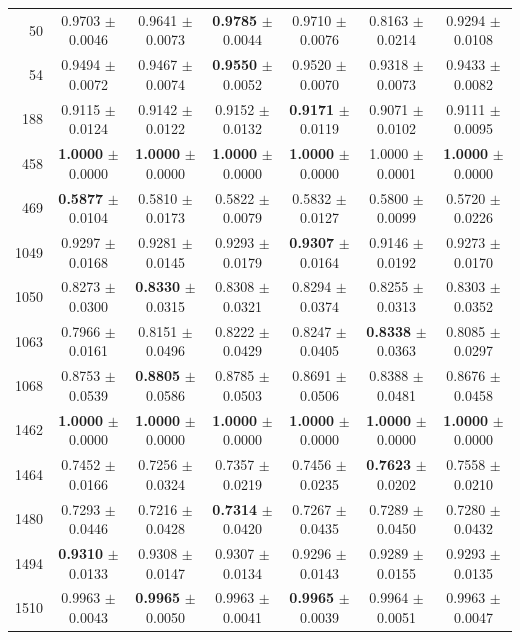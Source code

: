 \begin{table}[t]
\begin{tabular*}{\textwidth}{@{\extracolsep{\fill}}rcccccc@{}}
50 & 0.9703 $\pm$ 0.0046 & 0.9641 $\pm$ 0.0073 & \textbf{0.9785} $\pm$ 0.0044 & 0.9710 $\pm$ 0.0076 & 0.8163 $\pm$ 0.0214 & 0.9294 $\pm$ 0.0108 \\
54 & 0.9494 $\pm$ 0.0072 & 0.9467 $\pm$ 0.0074 & \textbf{0.9550} $\pm$ 0.0052 & 0.9520 $\pm$ 0.0070 & 0.9318 $\pm$ 0.0073 & 0.9433 $\pm$ 0.0082 \\
188 & 0.9115 $\pm$ 0.0124 & 0.9142 $\pm$ 0.0122 & 0.9152 $\pm$ 0.0132 & \textbf{0.9171} $\pm$ 0.0119 & 0.9071 $\pm$ 0.0102 & 0.9111 $\pm$ 0.0095 \\
458 & \textbf{1.0000} $\pm$ 0.0000 & \textbf{1.0000} $\pm$ 0.0000 & \textbf{1.0000} $\pm$ 0.0000 & \textbf{1.0000} $\pm$ 0.0000 & 1.0000 $\pm$ 0.0001 & \textbf{1.0000} $\pm$ 0.0000 \\
469 & \textbf{0.5877} $\pm$ 0.0104 & 0.5810 $\pm$ 0.0173 & 0.5822 $\pm$ 0.0079 & 0.5832 $\pm$ 0.0127 & 0.5800 $\pm$ 0.0099 & 0.5720 $\pm$ 0.0226 \\
1049 & 0.9297 $\pm$ 0.0168 & 0.9281 $\pm$ 0.0145 & 0.9293 $\pm$ 0.0179 & \textbf{0.9307} $\pm$ 0.0164 & 0.9146 $\pm$ 0.0192 & 0.9273 $\pm$ 0.0170 \\
1050 & 0.8273 $\pm$ 0.0300 & \textbf{0.8330} $\pm$ 0.0315 & 0.8308 $\pm$ 0.0321 & 0.8294 $\pm$ 0.0374 & 0.8255 $\pm$ 0.0313 & 0.8303 $\pm$ 0.0352 \\
1063 & 0.7966 $\pm$ 0.0161 & 0.8151 $\pm$ 0.0496 & 0.8222 $\pm$ 0.0429 & 0.8247 $\pm$ 0.0405 & \textbf{0.8338} $\pm$ 0.0363 & 0.8085 $\pm$ 0.0297 \\
1068 & 0.8753 $\pm$ 0.0539 & \textbf{0.8805} $\pm$ 0.0586 & 0.8785 $\pm$ 0.0503 & 0.8691 $\pm$ 0.0506 & 0.8388 $\pm$ 0.0481 & 0.8676 $\pm$ 0.0458 \\
1462 & \textbf{1.0000} $\pm$ 0.0000 & \textbf{1.0000} $\pm$ 0.0000 & \textbf{1.0000} $\pm$ 0.0000 & \textbf{1.0000} $\pm$ 0.0000 & \textbf{1.0000} $\pm$ 0.0000 & \textbf{1.0000} $\pm$ 0.0000 \\
1464 & 0.7452 $\pm$ 0.0166 & 0.7256 $\pm$ 0.0324 & 0.7357 $\pm$ 0.0219 & 0.7456 $\pm$ 0.0235 & \textbf{0.7623} $\pm$ 0.0202 & 0.7558 $\pm$ 0.0210 \\
1480 & 0.7293 $\pm$ 0.0446 & 0.7216 $\pm$ 0.0428 & \textbf{0.7314} $\pm$ 0.0420 & 0.7267 $\pm$ 0.0435 & 0.7289 $\pm$ 0.0450 & 0.7280 $\pm$ 0.0432 \\
1494 & \textbf{0.9310} $\pm$ 0.0133 & 0.9308 $\pm$ 0.0147 & 0.9307 $\pm$ 0.0134 & 0.9296 $\pm$ 0.0143 & 0.9289 $\pm$ 0.0155 & 0.9293 $\pm$ 0.0135 \\
1510 & 0.9963 $\pm$ 0.0043 & \textbf{0.9965} $\pm$ 0.0050 & 0.9963 $\pm$ 0.0041 & \textbf{0.9965} $\pm$ 0.0039 & 0.9964 $\pm$ 0.0051 & 0.9963 $\pm$ 0.0047 \\

\end{tabular*}
\end{table}
